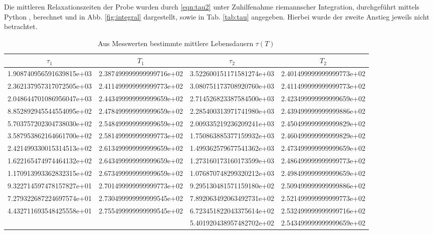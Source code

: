 Die mittleren Relaxationszeiten der Probe wurden durch \eqref{eqn:tau2} unter Zuhilfenahme riemannscher Integration, durchgeführt mittels Python \cite{Python}, berechnet und in Abb. \ref{fig:integral} dargestellt, sowie in Tab. \ref{tab:tau} angegeben. Hierbei wurde der zweite Anstieg jeweils nicht betrachtet.
\begin{table}
  \centering
  \caption{Aus Messwerten bestimmte mittlere Lebensdauern $\tau(T)$}
  \begin{tabular}{|S[round-precision = 2]|S|S[round-precision = 2]|S|}
    \toprule
    {$\tau_1$} & {$T_1$} & {$\tau_2$} & {$T_2$} \\
    \midrule
    1.908740956591639815e+03 & 2.387499999999999716e+02 & 3.522600151171581274e+03 & 2.401499999999999773e+02\\
    2.362137957317072505e+03 & 2.411499999999999773e+02 & 3.080751173708920760e+03 & 2.411499999999999773e+02\\
    2.048644701086956047e+03 & 2.443499999999999659e+02 & 2.714526823387584500e+03 & 2.423499999999999659e+02\\
    8.852892945544554095e+02 & 2.478499999999999659e+02 & 2.285400313971741980e+03 & 2.439499999999999886e+02\\
    5.703757202304738030e+02 & 2.548499999999999659e+02 & 2.009335219236209241e+03 & 2.450499999999999829e+02\\
    3.587953862164661700e+02 & 2.581499999999999773e+02 & 1.750863885377159932e+03 & 2.460499999999999829e+02\\
    2.421499330015314513e+02 & 2.613499999999999659e+02 & 1.499362579677541362e+03 & 2.473499999999999659e+02\\
    1.622165474974464132e+02 & 2.643499999999999659e+02 & 1.273160173160173599e+03 & 2.486499999999999773e+02\\
    1.170913993362832315e+02 & 2.673499999999999659e+02 & 1.076870748299320212e+03 & 2.498499999999999659e+02\\
    9.322714597478157827e+01 & 2.701499999999999773e+02 & 9.295130481571159180e+02 & 2.509499999999999886e+02\\
    7.279322687224697574e+01 & 2.730499999999999545e+02 & 7.892063492063492731e+02 & 2.521499999999999773e+02\\
    4.432711693548425558e+01 & 2.755499999999999545e+02 & 6.723451822043375614e+02 & 2.532499999999999716e+02\\
    &  & 5.401920438957482702e+02 & 2.543499999999999659e+02\\

\end{tabular}
\end{table}
